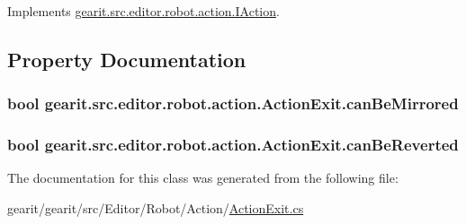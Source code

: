 Implements \hyperlink{interfacegearit_1_1src_1_1editor_1_1robot_1_1action_1_1_i_action_a8a84360c15fcd7d0f60ff7aef2dca980}{gearit.\+src.\+editor.\+robot.\+action.\+I\+Action}.



\subsection{Property Documentation}
\hypertarget{classgearit_1_1src_1_1editor_1_1robot_1_1action_1_1_action_exit_a38f5eb534d5eaddc25e6e17a90921ee6}{
\subsubsection[{can\+Be\+Mirrored}]{\setlength{\rightskip}{0pt plus 5cm}bool gearit.\+src.\+editor.\+robot.\+action.\+Action\+Exit.\+can\+Be\+Mirrored\hspace{0.3cm}{\ttfamily [get]}}}\label{classgearit_1_1src_1_1editor_1_1robot_1_1action_1_1_action_exit_a38f5eb534d5eaddc25e6e17a90921ee6}
\hypertarget{classgearit_1_1src_1_1editor_1_1robot_1_1action_1_1_action_exit_a8bec059fc8022d560c21213dfda039ba}{
\subsubsection[{can\+Be\+Reverted}]{\setlength{\rightskip}{0pt plus 5cm}bool gearit.\+src.\+editor.\+robot.\+action.\+Action\+Exit.\+can\+Be\+Reverted\hspace{0.3cm}{\ttfamily [get]}}}\label{classgearit_1_1src_1_1editor_1_1robot_1_1action_1_1_action_exit_a8bec059fc8022d560c21213dfda039ba}


The documentation for this class was generated from the following file\+:\begin{DoxyCompactItemize}
\item 
gearit/gearit/src/\+Editor/\+Robot/\+Action/\hyperlink{_robot_2_action_2_action_exit_8cs}{Action\+Exit.\+cs}\end{DoxyCompactItemize}
